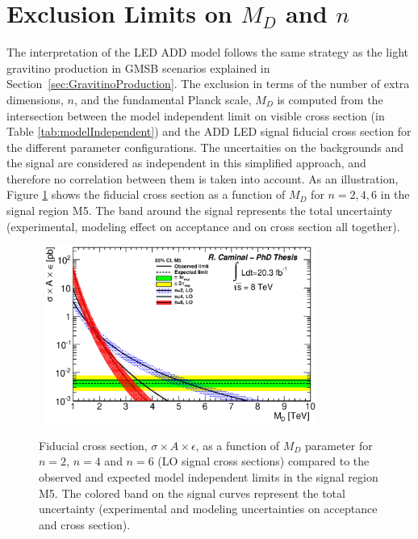 \section{Exclusion Limits on $M_D$ and $n$}

The interpretation of the LED ADD model follows the same strategy as the light gravitino production in GMSB scenarios explained in Section~\ref{sec:GravitinoProduction}.
The exclusion in terms of the number of extra dimensions, $n$, and the fundamental Planck scale, $M_D$ is computed from the intersection between the model independent limit on visible cross section (in Table \ref{tab:modelIndependent}) and the ADD LED signal fiducial cross section for the different parameter configurations.
The uncertaities on the backgrounds and the signal are considered as independent in this simplified approach, and therefore no correlation between them is taken into account.
As an illustration, Figure \ref{fig:ADDModelIndependentLOM5} shows the fiducial cross section as a function of $M_D$ for $n=2, 4, 6$ in the signal region M5.
The band around the signal represents the total uncertainty (experimental, modeling effect on acceptance and on cross section all together).

\begin{figure}[!ht]
\begin{center}
\mbox{
\includegraphics[width=0.795\textwidth]{Interpretations/Figures/ModelIndependentADD_LO_Stop_A9.eps}
}
\end{center}
\caption[Fiducial cross section, $\sigma \times A \times \epsilon$, for the ADD LED model as a function of $M_D$ parameter for $n=2$, $n=4$ and $n=6$ (LO signal cross sections) compared to the observed and expected model independent limits in M5.]{Fiducial cross section, $\sigma \times A \times \epsilon$, as a function of $M_D$ parameter for $n=2$, $n=4$ and $n=6$ (LO signal cross sections) compared to the observed and expected model independent limits in the signal region M5. The colored band on the signal curves represent the total uncertainty (experimental and modeling uncertainties on acceptance and cross section).}
\label{fig:ADDModelIndependentLOM5}
\end{figure}


